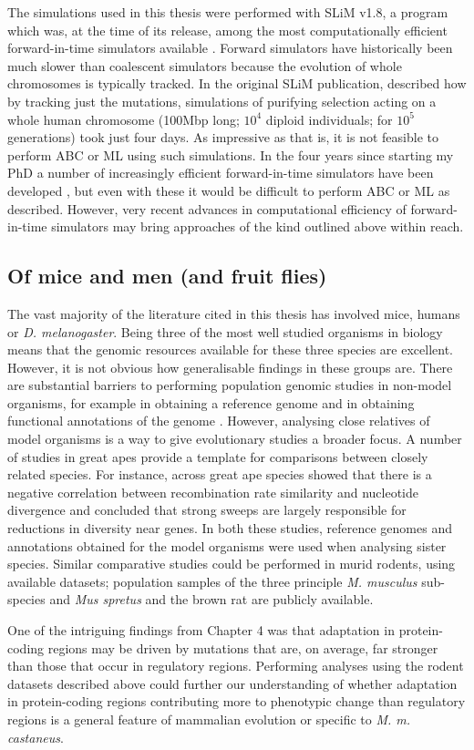 	The simulations used in this thesis were performed with SLiM v1.8, a program which was, at the time of its release, among the most computationally efficient forward-in-time simulators available \citep{RN148}. Forward simulators have historically been much slower than coalescent simulators because the evolution of whole chromosomes is typically tracked. In the original SLiM publication, \cite{RN148} described how by tracking just the mutations, simulations of purifying selection acting on a whole human chromosome (100Mbp long; $10^4$ diploid individuals; for $10^5$ generations) took just four days. As impressive as that is, it is not feasible to perform ABC or ML using such simulations. In the four years since starting my PhD a number of increasingly efficient forward-in-time simulators have been developed \citep{RN362, RN360, RN361}, but even with these it would be difficult to perform ABC or ML as described. However, very recent advances in computational efficiency of forward-in-time simulators \citep{RN359} may bring approaches of the kind outlined above within reach.

\subsection{Of mice and men (and fruit flies)}

	The vast majority of the literature cited in this thesis has involved mice, humans or \textit{D. melanogaster}. Being three of the most well studied organisms in biology means that the genomic resources available for these three species are excellent. However, it is not obvious how generalisable findings in these groups are. There are substantial barriers to performing population genomic studies in non-model organisms, for example in obtaining a reference genome and in obtaining functional annotations of the genome \citep{RN382}. However, analysing close relatives of model organisms is a way to give evolutionary studies a broader focus. A number of studies in great apes provide a template for comparisons between closely related species. For instance, across great ape species \cite{RN221} showed that there is a negative correlation between recombination rate similarity and nucleotide divergence and \cite{RN365} concluded that strong sweeps are largely responsible for reductions in diversity near genes. In both these studies, reference genomes and annotations obtained for the model organisms were used when analysing sister species. Similar comparative studies could be performed in murid rodents, using available datasets; population samples of the three principle \textit{M. musculus} sub-species and \textit{Mus spretus} \citep{RN383} and the brown rat \citep{RN327} are publicly available. 

	One of the intriguing findings from Chapter 4 was that adaptation in protein-coding regions may be driven by mutations that are, on average, far stronger than those that occur in regulatory regions. Performing analyses using the rodent datasets described above could further our understanding of whether adaptation in protein-coding regions contributing more to phenotypic change than regulatory regions is a general feature of mammalian evolution or specific to \textit{M. m. castaneus}.